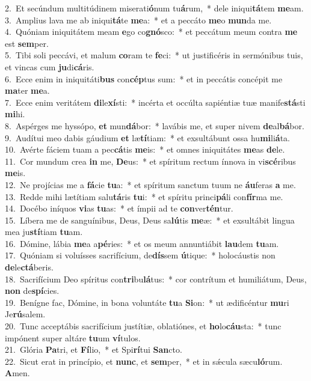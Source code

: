 {2.~}Et secúndum multitúdinem miserati\textbf{ó}num tu\textbf{á}rum,~* dele iniqui\textbf{tá}tem \textbf{me}am.\\
{3.~}Amplius lava me ab iniqui\textbf{tá}te \textbf{me}a:~* et a peccáto \textbf{me}o \textbf{mun}da me.\\
{4.~}Quóniam iniquitátem meam \textbf{e}go co\textbf{gnó}sco:~* et peccátum meum contra \textbf{me} est \textbf{sem}per.\\
{5.~}Tibi soli peccávi, et malum \textbf{co}ram te \textbf{fe}ci:~* ut justificéris in sermónibus tuis, et vincas cum \textbf{ju}di\textbf{cá}ris.\\
{6.~}Ecce enim in iniquitáti\textbf{bus} con\textbf{cép}tus sum:~* et in peccátis concépit me \textbf{ma}ter \textbf{me}a.\\
{7.~}Ecce enim veritátem \textbf{di}le\textbf{xí}sti:~* incérta et occúlta sapiéntiæ tuæ manife\textbf{stá}sti \textbf{mi}hi.\\
{8.~}Aspérges me hyssópo, \textbf{et} mun\textbf{dá}bor:~* lavábis me, et super nivem \textbf{de}al\textbf{bá}bor.\\
{9.~}Audítui meo dabis gáudium \textbf{et} læ\textbf{tí}tiam:~* et exsultábunt ossa hu\textbf{mi}li\textbf{á}ta.\\
{10.~}Avérte fáciem tuam a pec\textbf{cá}tis \textbf{me}is:~* et omnes iniquitátes \textbf{me}as \textbf{de}le.\\
{11.~}Cor mundum crea \textbf{in} me, \textbf{De}us:~* et spíritum rectum ínnova in vi\textbf{scé}ribus \textbf{me}is.\\
{12.~}Ne projícias me a \textbf{fá}cie \textbf{tu}a:~* et spíritum sanctum tuum ne \textbf{áu}feras \textbf{a} me.\\
{13.~}Redde mihi lætítiam salu\textbf{tá}ris \textbf{tu}i:~* et spíritu princi\textbf{pá}li con\textbf{fír}ma me.\\
{14.~}Docébo iníquos \textbf{vi}as \textbf{tu}as:~* et ímpii ad te \textbf{con}ver\textbf{tén}tur.\\
{15.~}Líbera me de sanguínibus, Deus, Deus sa\textbf{lú}tis \textbf{me}æ:~* et exsultábit lingua mea ju\textbf{stí}tiam \textbf{tu}am.\\
{16.~}Dómine, lábia \textbf{me}a a\textbf{pé}ries:~* et os meum annuntiábit \textbf{lau}dem \textbf{tu}am.\\
{17.~}Quóniam si voluísses sacrifícium, de\textbf{dís}sem \textbf{ú}tique:~* holocáustis non \textbf{de}le\textbf{ctá}beris.\\
{18.~}Sacrifícium Deo spíritus con\textbf{tri}bu\textbf{lá}tus:~* cor contrítum et humiliátum, Deus, \textbf{non} de\textbf{spí}cies.\\
{19.~}Benígne fac, Dómine, in bona voluntáte \textbf{tu}a \textbf{Si}on:~* ut ædificéntur \textbf{mu}ri Je\textbf{rú}salem.\\
{20.~}Tunc acceptábis sacrifícium justítiæ, oblatiónes, et \textbf{ho}lo\textbf{cáu}sta:~* tunc impónent super altáre \textbf{tu}um \textbf{ví}tulos.\\
{21.~}Glória \textbf{Pa}tri, et \textbf{Fí}lio,~* et Spi\textbf{rí}tui \textbf{San}cto.\\
{22.~}Sicut erat in princípio, et \textbf{nunc}, et \textbf{sem}per,~* et in sǽcula sæcu\textbf{ló}rum. \textbf{A}men.\\
